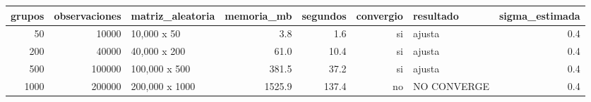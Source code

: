 \begin{tabular}{rrlrrrlr}
\toprule
grupos & observaciones & matriz\_aleatoria & memoria\_mb & segundos & convergio & resultado & sigma\_estimada \\
\midrule
50 & 10000 & 10,000 x 50 & 3.8 & 1.6 & si & ajusta & 0.4 \\
200 & 40000 & 40,000 x 200 & 61.0 & 10.4 & si & ajusta & 0.4 \\
500 & 100000 & 100,000 x 500 & 381.5 & 37.2 & si & ajusta & 0.4 \\
1000 & 200000 & 200,000 x 1000 & 1525.9 & 137.4 & no & NO CONVERGE & 0.4 \\
\bottomrule
\end{tabular}
